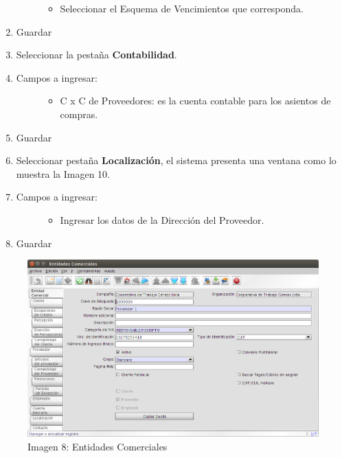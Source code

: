 \documentclass[letterpaper,10pt,spanish]{sphinxmanual}
\begin{document}
\begin{enumerate}
\begin{description}
\begin{itemize}
\item {} 
Seleccionar el Esquema de Vencimientos que corresponda.

\end{itemize}

\end{description}

\item {} 
Guardar

\item {} 
Seleccionar la pestaña \textbf{Contabilidad}.

\item {} \begin{description}
\item[{Campos a ingresar:}] \leavevmode\begin{itemize}
\item {} 
C x C de Proveedores: es la cuenta contable para los asientos de compras.

\end{itemize}

\end{description}

\item {} 
Guardar

\item {} 
Seleccionar pestaña \textbf{Localización}, el sistema presenta una ventana como lo muestra la Imagen 10.

\item {} \begin{description}
\item[{Campos a ingresar:}] \leavevmode\begin{itemize}
\item {} 
Ingresar los datos de la Dirección del Proveedor.

\end{itemize}

\end{description}

\item {} 
Guardar

\end{enumerate}
\begin{figure}[htbp]
\centering
\capstart

\includegraphics{ly_prov_gen.png}
\caption{Imagen 8: Entidades Comerciales}\end{figure}
\end{document}
